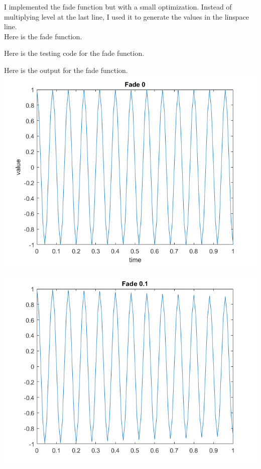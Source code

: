 \documentclass[11pt]{article}
\begin{document}
I implemented the fade function but with a small optimization. Instead of multiplying level at the last line, I used it to generate the values in the linspace line.\\

Here is the fade function.\\



\vspace{10pt}

Here is the testing code for the fade function.\\



\vspace{10pt}

Here is the output for the fade function.\\

\includegraphics[scale=0.7]{fade0.png}

\includegraphics[scale=0.7]{fade0.1.png}
\end{document}
